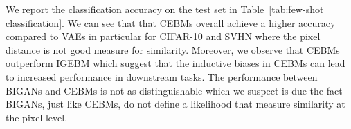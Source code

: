 \documentclass{article}
\begin{document}
We report the classification accuracy on the test set in Table~\ref{tab:few-shot classification}. We can see that that CEBMs overall achieve a higher accuracy compared to VAEs in particular for CIFAR-10 and SVHN where the pixel distance is not good measure for similarity. Moreover, we observe that CEBMs outperform IGEBM which suggest that the inductive biases in CEBMs can lead to increased performance in downstream tasks. The performance between BIGANs and CEBMs is not as distinguishable which we suspect is due the fact BIGANs, just like CEBMs, do not define a likelihood that measure similarity at the pixel level. 

\end{document}
